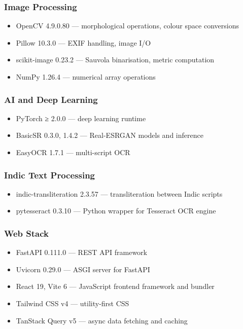 \subsubsection{Image Processing}
\begin{itemize}
	\item OpenCV 4.9.0.80 — morphological operations, colour space conversions
	\item Pillow 10.3.0 — EXIF handling, image I/O
	\item scikit-image 0.23.2 — Sauvola binarisation, metric computation
	\item NumPy 1.26.4 — numerical array operations
\end{itemize}

\subsubsection{AI and Deep Learning}
\begin{itemize}
	\item PyTorch ≥ 2.0.0 — deep learning runtime
	\item BasicSR 0.3.0, 1.4.2 — Real-ESRGAN models and inference
	\item EasyOCR 1.7.1 — multi-script OCR
\end{itemize}

\subsubsection{Indic Text Processing}
\begin{itemize}
	\item indic-transliteration 2.3.57 — transliteration between Indic scripts
	\item pytesseract 0.3.10 — Python wrapper for Tesseract OCR engine
\end{itemize}

\subsubsection{Web Stack}
\begin{itemize}
	\item FastAPI 0.111.0 — REST API framework
	\item Uvicorn 0.29.0 — ASGI server for FastAPI
	\item React 19, Vite 6 — JavaScript frontend framework and bundler
	\item Tailwind CSS v4 — utility-first CSS
	\item TanStack Query v5 — async data fetching and caching
\end{itemize}

